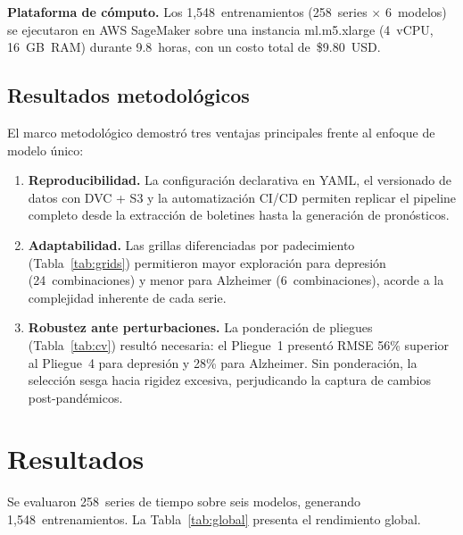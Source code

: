 \documentclass[12pt,a4paper]{article}
\begin{document}
\noindent\textbf{Plataforma de cómputo.}
Los 1,548~entrenamientos (258~series $\times$ 6~modelos) se ejecutaron en AWS SageMaker sobre una instancia ml.m5.xlarge (4~vCPU, 16~GB~RAM) durante 9.8~horas, con un costo total de~\$9.80~USD.

\subsection*{Resultados metodológicos}

El marco metodológico demostró tres ventajas principales frente al enfoque de modelo único:

\begin{enumerate}[nosep]
    \item \textbf{Reproducibilidad.} La configuración declarativa en YAML, el versionado de datos con DVC + S3 y la automatización CI/CD permiten replicar el pipeline completo desde la extracción de boletines hasta la generación de pronósticos.

    \item \textbf{Adaptabilidad.} Las grillas diferenciadas por padecimiento (Tabla~\ref{tab:grids}) permitieron mayor exploración para depresión (24~combinaciones) y menor para Alzheimer (6~combinaciones), acorde a la complejidad inherente de cada serie.

    \item \textbf{Robustez ante perturbaciones.} La ponderación de pliegues (Tabla~\ref{tab:cv}) resultó necesaria: el Pliegue~1 presentó RMSE 56\% superior al Pliegue~4 para depresión y 28\% para Alzheimer. Sin ponderación, la selección sesga hacia rigidez excesiva, perjudicando la captura de cambios post-pandémicos.
\end{enumerate}

\section*{Resultados}

Se evaluaron 258~series de tiempo sobre seis modelos, generando 1,548~entrenamientos. La Tabla~\ref{tab:global} presenta el rendimiento global.
\end{document}
